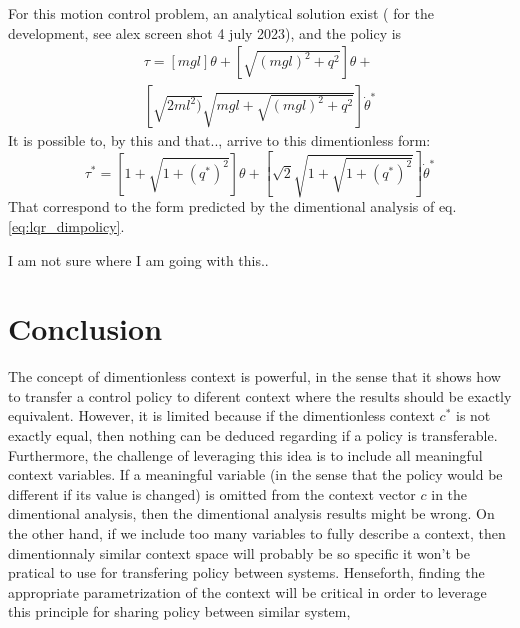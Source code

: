 For this motion control problem, an analytical solution exist ( for the development, see alex screen shot 4 july 2023), and the policy is
\begin{align}
\tau = 
\left[
mgl \right] \theta
+
\left[
\sqrt{ (mgl)^2 + q^2} \right] \theta
+\\
\left[
\sqrt{ 2 ml^2)} \sqrt{mgl+ \sqrt{ (mgl)^2 + q^2}}
\right] \dot{\theta}^*
\label{eq:lqr_dimpolicy}
\end{align}
It is possible to, by this and that.., arrive to this dimentionless form:
\begin{equation}
\tau^* = 
\left[
1 + \sqrt{ 1 + (q^*)^2}
\right] \theta
+
\left[
\sqrt{2} \sqrt{ 1 + \sqrt{ 1 + (q^*)^2}}
\right] \dot{\theta}^*
\end{equation}
That correspond to the form predicted by the dimentional analysis of eq. \eqref{eq:lqr_dimpolicy}.

I am not sure where I am going with this..


\newpage
\section{Conclusion}


The concept of dimentionless context is powerful, in the sense that it shows how to transfer a control policy to diferent context where the results should be exactly equivalent. However, it is limited because if the dimentionless context $c^*$ is not exactly equal, then nothing can be deduced regarding if a policy is transferable. Furthermore, the challenge of leveraging this idea is to include all meaningful context variables. If a meaningful variable (in the sense that the policy would be different if its value is changed) is omitted from the context vector $c$ in the dimentional analysis, then the dimentional analysis results might be wrong. On the other hand, if we include too many variables to fully describe a context, then dimentionnaly similar context space will probably be so specific it won't be pratical to use for transfering policy between systems. Henseforth, finding the appropriate parametrization of the context will be critical in order to leverage this principle for sharing policy between similar system, 

